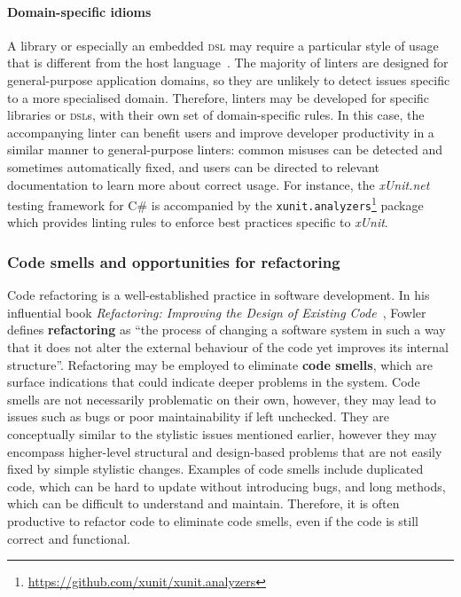 \documentclass[../../main.tex]{subfiles}
\begin{document}
\paragraph{Domain-specific idioms}
A library or especially an embedded \textsc{dsl} may require a particular style of usage that is different from the host language~\cite{hora_domain_2012}.
The majority of linters are designed for general-purpose application domains, so they are unlikely to detect issues specific to a more specialised domain.
Therefore, linters may be developed for specific libraries or \textsc{dsl}s, with their own set of domain-specific rules.
In this case, the accompanying linter can benefit users and improve developer productivity in a similar manner to general-purpose linters: common misuses can be detected and sometimes automatically fixed, and users can be directed to relevant documentation to learn more about correct usage.
For instance, the \emph{xUnit.net} testing framework for C\# is accompanied by the \texttt{xunit.analyzers}\footnote{\url{https://github.com/xunit/xunit.analyzers}} package which provides linting rules to enforce best practices specific to \emph{xUnit}.

\subsubsection{Code smells and opportunities for refactoring}

Code refactoring is a well-established practice in software development.
In his influential book \emph{Refactoring: Improving the Design of Existing Code}~\cite{fowler_refactoring_2018}, Fowler defines \textbf{refactoring} as ``the process of changing a software system in such a way that it does not alter the external behaviour of the code yet improves its internal structure''.
Refactoring may be employed to eliminate \textbf{code smells}, which are surface indications that could indicate deeper problems in the system.
Code smells are not necessarily problematic on their own, however, they may lead to issues such as bugs or poor maintainability if left unchecked.
They are conceptually similar to the stylistic issues mentioned earlier, however they may encompass higher-level structural and design-based problems that are not easily fixed by simple stylistic changes.
Examples of code smells include duplicated code, which can be hard to update without introducing bugs, and long methods, which can be difficult to understand and maintain.
Therefore, it is often productive to refactor code to eliminate code smells, even if the code is still correct and functional.
\end{document}

